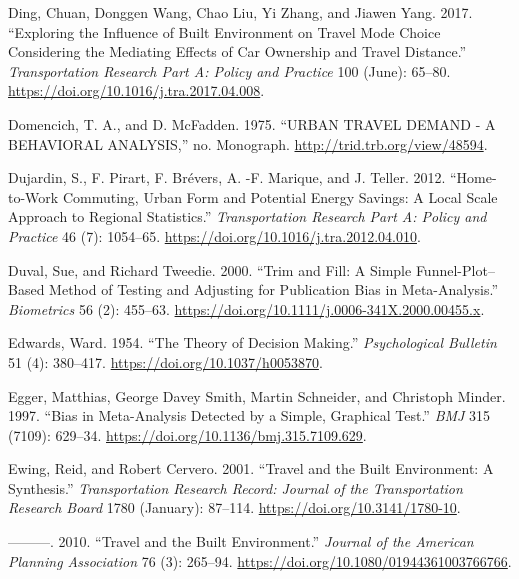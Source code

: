 \documentclass[
  11pt,
  openany]{memoir}
\newlength{\cslhangindent}
\newlength{\cslentryspacingunit} %
\newenvironment{CSLReferences}[2] %
 {%
  \setlength{\parindent}{0pt}
  \ifodd #1
  \let\oldpar\par
  \def\par{\hangindent=\cslhangindent\oldpar}
  \fi
  \setlength{\parskip}{#2\cslentryspacingunit}
 }%
 {}
\begin{document}
\begin{CSLReferences}{1}{0}
\leavevmode{}%
Ding, Chuan, Donggen Wang, Chao Liu, Yi Zhang, and Jiawen Yang. 2017. {``Exploring the Influence of Built Environment on Travel Mode Choice Considering the Mediating Effects of Car Ownership and Travel Distance.''} \emph{Transportation Research Part A: Policy and Practice} 100 (June): 65--80. \url{https://doi.org/10.1016/j.tra.2017.04.008}.

\leavevmode{}%
Domencich, T. A., and D. McFadden. 1975. {``{URBAN TRAVEL DEMAND} - {A BEHAVIORAL ANALYSIS},''} no. Monograph. \url{http://trid.trb.org/view/48594}.

\leavevmode{}%
Dujardin, S., F. Pirart, F. Brévers, A. -F. Marique, and J. Teller. 2012. {``Home-to-Work Commuting, Urban Form and Potential Energy Savings: A Local Scale Approach to Regional Statistics.''} \emph{Transportation Research Part A: Policy and Practice} 46 (7): 1054--65. \url{https://doi.org/10.1016/j.tra.2012.04.010}.

\leavevmode{}%
Duval, Sue, and Richard Tweedie. 2000. {``Trim and {Fill}: A {Simple Funnel}-{Plot}--{Based Method} of {Testing} and {Adjusting} for {Publication Bias} in {Meta}-{Analysis}.''} \emph{Biometrics} 56 (2): 455--63. \url{https://doi.org/10.1111/j.0006-341X.2000.00455.x}.

\leavevmode{}%
Edwards, Ward. 1954. {``The Theory of Decision Making.''} \emph{Psychological Bulletin} 51 (4): 380--417. \url{https://doi.org/10.1037/h0053870}.

\leavevmode{}%
Egger, Matthias, George Davey Smith, Martin Schneider, and Christoph Minder. 1997. {``Bias in Meta-Analysis Detected by a Simple, Graphical Test.''} \emph{BMJ} 315 (7109): 629--34. \url{https://doi.org/10.1136/bmj.315.7109.629}.

\leavevmode{}%
Ewing, Reid, and Robert Cervero. 2001. {``Travel and the {Built Environment}: A {Synthesis}.''} \emph{Transportation Research Record: Journal of the Transportation Research Board} 1780 (January): 87--114. \url{https://doi.org/10.3141/1780-10}.

\leavevmode{}%
---------. 2010. {``Travel and the {Built Environment}.''} \emph{Journal of the American Planning Association} 76 (3): 265--94. \url{https://doi.org/10.1080/01944361003766766}.


\end{CSLReferences}
\end{document}
